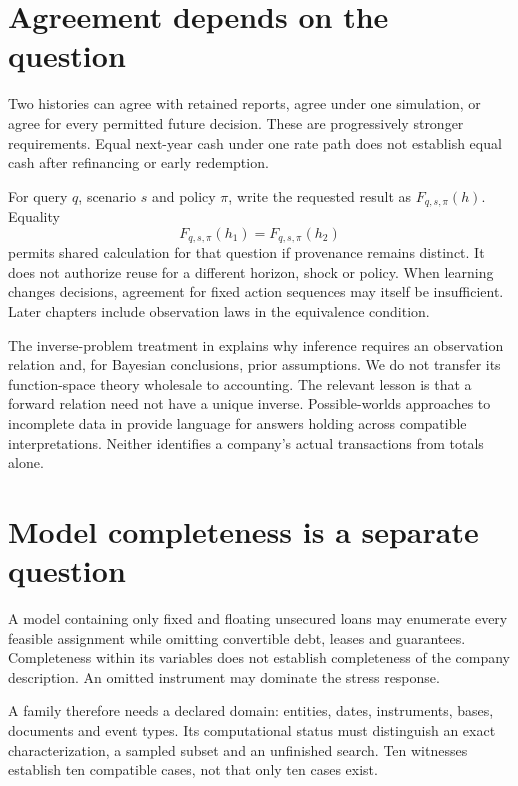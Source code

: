 \section{Agreement depends on the question}
Two histories can agree with retained reports, agree under one simulation, or agree for every permitted future decision. These are progressively stronger requirements. Equal next-year cash under one rate path does not establish equal cash after refinancing or early redemption.

For query $q$, scenario $s$ and policy $\pi$, write the requested result as $F_{q,s,\pi}(h)$. Equality
\begin{equation}
 F_{q,s,\pi}(h_1)=F_{q,s,\pi}(h_2)
\end{equation}
permits shared calculation for that question if provenance remains distinct. It does not authorize reuse for a different horizon, shock or policy. When learning changes decisions, agreement for fixed action sequences may itself be insufficient. Later chapters include observation laws in the equivalence condition.

The inverse-problem treatment in \citet{stuart2010} explains why inference requires an observation relation and, for Bayesian conclusions, prior assumptions. We do not transfer its function-space theory wholesale to accounting. The relevant lesson is that a forward relation need not have a unique inverse. Possible-worlds approaches to incomplete data in \citet{libkin2014,libkin2016certain} provide language for answers holding across compatible interpretations. Neither identifies a company's actual transactions from totals alone.

\section{Model completeness is a separate question}
A model containing only fixed and floating unsecured loans may enumerate every feasible assignment while omitting convertible debt, leases and guarantees. Completeness within its variables does not establish completeness of the company description. An omitted instrument may dominate the stress response.

A family therefore needs a declared domain: entities, dates, instruments, bases, documents and event types. Its computational status must distinguish an exact characterization, a sampled subset and an unfinished search. Ten witnesses establish ten compatible cases, not that only ten cases exist.

